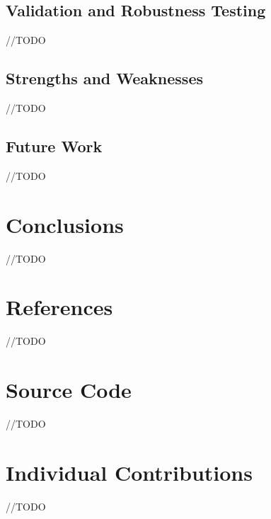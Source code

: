 \documentclass[titlepage]{article}
\begin{document}
\subsection{Validation and Robustness Testing}
	//TODO
\subsection{Strengths and Weaknesses}
	//TODO
\subsection{Future Work}
	//TODO

\section{Conclusions}
	//TODO
\section{References}
	//TODO
\section{Source Code}
	//TODO
\section{Individual Contributions}
	//TODO
\end{document}
